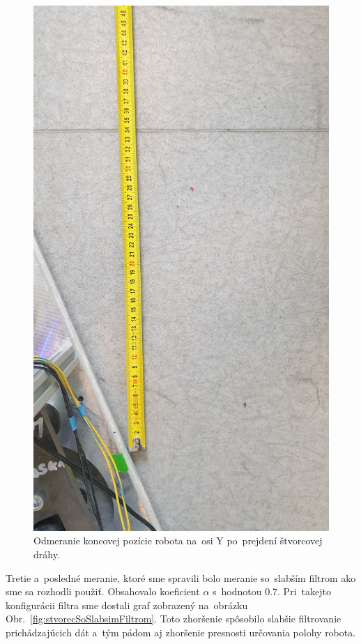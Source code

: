 \begin{figure}[!htbp]
	\begin{center}
		\includegraphics[width=\textwidth]{img/robot_stop_measured_Y.jpg}
	\end{center}
	\caption{Odmeranie koncovej pozície robota na~osi Y po~prejdení štvorcovej dráhy.}
	\label{fig:stvorec_meranie_Y}
\end{figure}

\clearpage

Tretie a~posledné meranie, ktoré sme spravili bolo meranie so~slabším filtrom ako sme sa rozhodli použiť. Obsahovalo
koeficient $\alpha$ s~hodnotou 0.7. Pri~takejto konfigurácii filtra sme dostali graf zobrazený na~obrázku
Obr.~\ref{fig:stvorecSoSlabsimFiltrom}. Toto zhoršenie spôsobilo slabšie filtrovanie prichádzajúcich dát a~tým pádom aj
zhoršenie presnosti určovania polohy robota.

